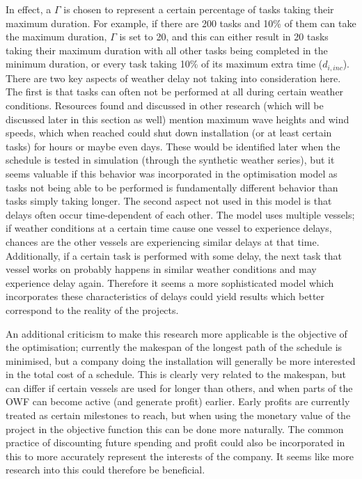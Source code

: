 \documentclass[a4paper,12pt]{article}
\begin{document}
In effect, a $\Gamma$ is chosen to represent a certain percentage of tasks taking their maximum duration. For example, if there are 200 tasks and 10\% of them can take the maximum duration, $\Gamma$ is set to 20, and this can either result in 20 tasks taking their maximum duration with all other tasks being completed in the minimum duration, or every task taking 10\% of its maximum extra time ($d_{i, inc}$). There are two key aspects of weather delay not taking into consideration here. The first is that tasks can often not be performed at all during certain weather conditions. Resources found and discussed in other research (which will be discussed later in this section as well) mention maximum wave heights and wind speeds, which when reached could shut down installation (or at least certain tasks) for hours or maybe even days. These would be identified later when the schedule is tested in simulation (through the synthetic weather series), but it seems valuable if this behavior was incorporated in the optimisation model as tasks not being able to be performed is fundamentally different behavior than tasks simply taking longer. The second aspect not used in this model is that delays often occur time-dependent of each other. The model uses multiple vessels; if weather conditions at a certain time cause one vessel to experience delays, chances are the other vessels are experiencing similar delays at that time. Additionally, if a certain task is performed with some delay, the next task that vessel works on probably happens in similar weather conditions and may experience delay again. Therefore it seems a more sophisticated model which incorporates these characteristics of delays could yield results which better correspond to the reality of the projects. 

An additional criticism to make this research more applicable is the objective of the optimisation; currently the makespan of the longest path of the schedule is minimised, but a company doing the installation will generally be more interested in the total cost of a schedule. This is clearly very related to the makespan, but can differ if certain vessels are used for longer than others, and when parts of the OWF can become active (and generate profit) earlier. Early profits are currently treated as certain milestones to reach, but when using the monetary value of the project in the objective function this can be done more naturally. The common practice of discounting future spending and profit could also be incorporated in this to more accurately represent the interests of the company. It seems like more research into this could therefore be beneficial. 
\end{document}
